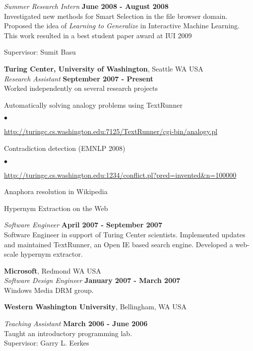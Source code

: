 \documentclass[margin,line]{res}
\newenvironment{list1}{
  \begin{list}{\ding{113}}{%
      \setlength{\itemsep}{0in}
      \setlength{\parsep}{0in} \setlength{\parskip}{0in}
      \setlength{\topsep}{0in} \setlength{\partopsep}{0in} 
      \setlength{\leftmargin}{0.17in}}}{\end{list}}
\newenvironment{list2}{
  \begin{list}{$\bullet$}{%
      \setlength{\itemsep}{0in}
      \setlength{\parsep}{0in} \setlength{\parskip}{0in}
      \setlength{\topsep}{0in} \setlength{\partopsep}{0in} 
      \setlength{\leftmargin}{0.2in}}}{\end{list}}
\begin{document}
\begin{resume}
\vspace{-.3cm}
{\em Summer Research Intern} \hfill {\bf June 2008 - August 2008}\\
Investigated new methods for Smart Selection in the file browser domain.  
Proposed the idea of {\em Learning to Generalize} in Interactive Machine
Learning.  This work resulted in a best student paper award at IUI 2009

Supervisor: Sumit Basu

{\bf Turing Center, University of Washington}, Seattle WA USA\\

\vspace{-.3cm}
{\em Research Assistant} \hfill {\bf September 2007 - Present}\\
Worked independently on several research projects
\begin{list1}
\item[] Automatically solving analogy problems using {\sc TextRunner}
  \begin{list2}
  \item \url{http://turingc.cs.washington.edu:7125/TextRunner/cgi-bin/analogy.pl}
  \end{list2}
\item[] Contradiction detection (EMNLP 2008)
  \begin{list2}
  \item \url{http://turingc.cs.washington.edu:1234/conflict.pl?pred=invented&n=100000}
  \end{list2}
\item[] Anaphora resolution in Wikipedia
\item[] Hypernym Extraction on the Web
\end{list1}

{\em Software Engineer} \hfill {\bf April 2007 - September 2007}\\
Software Engineer in support of Turing Center scientists.
Implemented updates and maintained {\sc TextRunner}, an Open IE based search
engine.  Developed
a web-scale hypernym extractor.

{\bf Microsoft}, Redmond WA USA\\

\vspace{-.3cm}
{\em Software Design Engineer} \hfill {\bf January 2007 - March 2007}\\
Windows Media DRM group.

{\bf Western Washington University}, Bellingham, WA USA

\vspace{-.3cm}
{\em Teaching Assistant} \hfill {\bf March 2006  - June 2006}\\
Taught an introductory programming lab. \\
Supervisor: Garry L. Eerkes


\end{resume}
\end{document}

